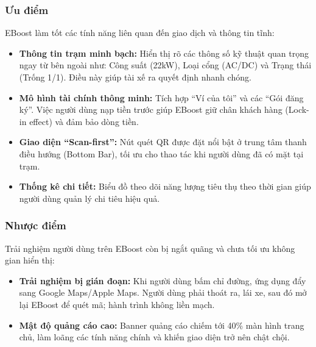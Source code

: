 \subsubsection{Ưu điểm}
EBoost làm tốt các tính năng liên quan đến giao dịch và thông tin tĩnh:
\begin{itemize}
    \item \textbf{Thông tin trạm minh bạch:} Hiển thị rõ các thông số kỹ thuật quan trọng ngay từ bên ngoài như: Công suất (22kW), Loại cổng (AC/DC) và Trạng thái (Trống 1/1). Điều này giúp tài xế ra quyết định nhanh chóng.
    \item \textbf{Mô hình tài chính thông minh:} Tích hợp ``Ví của tôi'' và các ``Gói đăng ký''. Việc người dùng nạp tiền trước giúp EBoost giữ chân khách hàng (Lock-in effect) và đảm bảo dòng tiền.
    \item \textbf{Giao diện ``Scan-first'':} Nút quét QR được đặt nổi bật ở trung tâm thanh điều hướng (Bottom Bar), tối ưu cho thao tác khi người dùng đã có mặt tại trạm.
    \item \textbf{Thống kê chi tiết:} Biểu đồ theo dõi năng lượng tiêu thụ theo thời gian giúp người dùng quản lý chi tiêu hiệu quả.
\end{itemize}

\subsubsection{Nhược điểm}
Trải nghiệm người dùng trên EBoost còn bị ngắt quãng và chưa tối ưu không gian hiển thị:
\begin{itemize}
    \item \textbf{Trải nghiệm bị gián đoạn:} Khi người dùng bấm chỉ đường, ứng dụng đẩy sang Google Maps/Apple Maps. Người dùng phải thoát ra, lái xe, sau đó mở lại EBoost để quét mã; hành trình không liền mạch.
    \item \textbf{Mật độ quảng cáo cao:} Banner quảng cáo chiếm tới 40\% màn hình trang chủ, làm loãng các tính năng chính và khiến giao diện trở nên chật chội.
\end{itemize}

